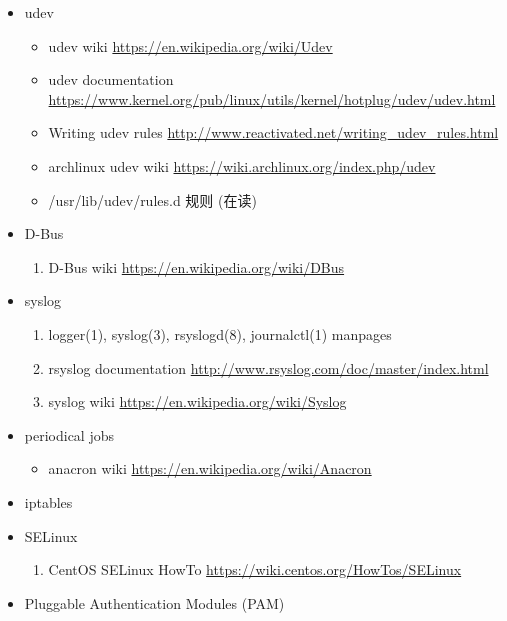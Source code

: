 \documentclass{article}
\begin{document}
\begin{itemize}
\begin{enumerate}
        \end{enumerate}
    \item udev
        \begin{itemize}
            \item udev wiki \url{https://en.wikipedia.org/wiki/Udev}
            \item udev documentation \url{https://www.kernel.org/pub/linux/utils/kernel/hotplug/udev/udev.html}
            \item Writing udev rules \url{http://www.reactivated.net/writing_udev_rules.html}
            \item archlinux udev wiki \url{https://wiki.archlinux.org/index.php/udev}
            \item /usr/lib/udev/rules.d 规则 (在读)
        \end{itemize}
    \item D-Bus
        \begin{enumerate}
            \item D-Bus wiki \url{https://en.wikipedia.org/wiki/DBus}
        \end{enumerate}
    \item syslog
        \begin{enumerate}
            \item logger(1), syslog(3), rsyslogd(8), journalctl(1) manpages
            \item rsyslog documentation \url{http://www.rsyslog.com/doc/master/index.html}
            \item syslog wiki \url{https://en.wikipedia.org/wiki/Syslog}
        \end{enumerate}
    \item periodical jobs
        \begin{itemize}
            \item anacron wiki \url{https://en.wikipedia.org/wiki/Anacron}
        \end{itemize}
    \item iptables
        \begin{enumerate}
        \end{enumerate}
    \item SELinux
        \begin{enumerate}
            \item CentOS SELinux HowTo \url{https://wiki.centos.org/HowTos/SELinux}
        \end{enumerate}
    \item Pluggable Authentication Modules (PAM)
        \begin{enumerate}

\end{enumerate}
\end{itemize}
\end{document}

